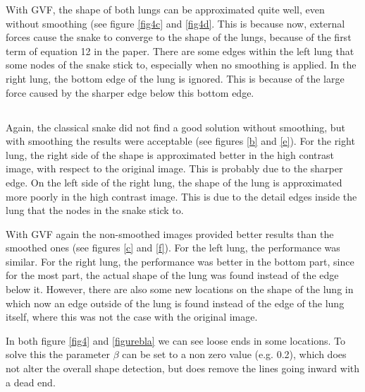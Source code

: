 \documentclass{article}
\begin{document}
With GVF, the shape of both lungs can be approximated quite well, even without smoothing (see figure \ref{fig4c} and \ref{fig4d}. This is because now, external forces cause the snake to converge to the shape of the lungs, because of the first term of equation 12 in the paper. There are some edges within the left lung that some nodes of the snake stick to, especially when no smoothing is applied. In the right lung, the bottom edge of the lung is ignored. This is because of the large force caused by the sharper edge below this bottom edge.

\subsection{}
Again, the classical snake did not find a good solution without smoothing, but with smoothing the results were acceptable (see figures \ref{b} and \ref{e}). For the right lung, the right side of the shape is approximated better in the high contrast image, with respect to the original image. This is probably due to the sharper edge. On the left side of the right lung, the shape of the lung is approximated more poorly in the high contrast image. This is due to the detail edges inside the lung that the nodes in the snake stick to.

With GVF again the non-smoothed images provided better results than the smoothed ones (see figures \ref{c} and \ref{f}). For the left lung, the performance was similar. For the right lung, the performance was better in the bottom part, since for the most part, the actual shape of the lung was found instead of the edge below it. However, there are also some new locations on the shape of the lung in which now an edge outside of the lung is found instead of the edge of the lung itself, where this was not the case with the original image.

In both figure \ref{fig4} and \ref{figurebla} we can see loose ends in some locations. To solve this the parameter $\beta$ can be set to a non zero value (e.g. 0.2), which does not alter the overall shape detection, but does remove the lines going inward with a dead end.
\end{document}
